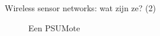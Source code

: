 \documentclass[presentation, bigger]{beamer}
\begin{document}
\begin{frame}[label=sec-1-2]{Wireless sensor networks: wat zijn ze? (2)}
  \begin{figure}
    \caption{Een PSUMote}
  \end{figure}

\end{frame}
\end{document}
